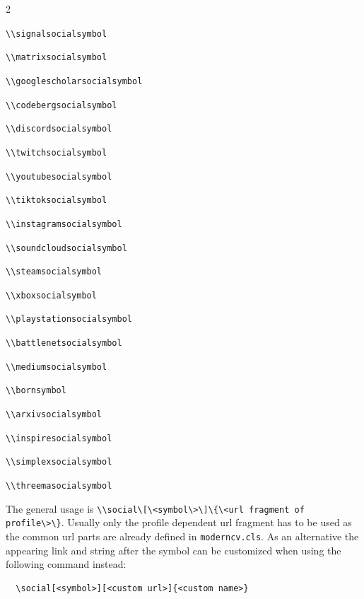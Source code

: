 \documentclass[a4paper, 11pt]{article}
\newcommand{\code}[1]{\lstinline!#1!}
\begin{document}
\begin{itemize}
\begin{multicols}{2}
    \item \code{\\signalsocialsymbol}
    \item \code{\\matrixsocialsymbol}
    \item \code{\\googlescholarsocialsymbol}
    \item \code{\\codebergsocialsymbol}
    \item \code{\\discordsocialsymbol}
    \item \code{\\twitchsocialsymbol}
    \item \code{\\youtubesocialsymbol}
    \item \code{\\tiktoksocialsymbol}
    \item \code{\\instagramsocialsymbol}
    \item \code{\\soundcloudsocialsymbol}
    \item \code{\\steamsocialsymbol}
    \item \code{\\xboxsocialsymbol}
    \item \code{\\playstationsocialsymbol}
    \item \code{\\battlenetsocialsymbol}
    \item \code{\\mediumsocialsymbol}
    \item \code{\\bornsymbol}
    \item \code{\\arxivsocialsymbol}
    \item \code{\\inspiresocialsymbol}
    \item \code{\\simplexsocialsymbol}
    \item \code{\\threemasocialsymbol}
  \end{multicols}
\end{itemize}

The general usage is \code{\\social\[\<symbol\>\]\{\<url fragment of profile\>\}}. Usually only the profile dependent url fragment has to be used as the common url parts are already defined in \texttt{moderncv.cls}.
As an alternative the appearing link and string after the symbol can be customized when using the following command instead:
\begin{lstlisting}
  \social[<symbol>][<custom url>]{<custom name>}
\end{lstlisting}
\end{document}
